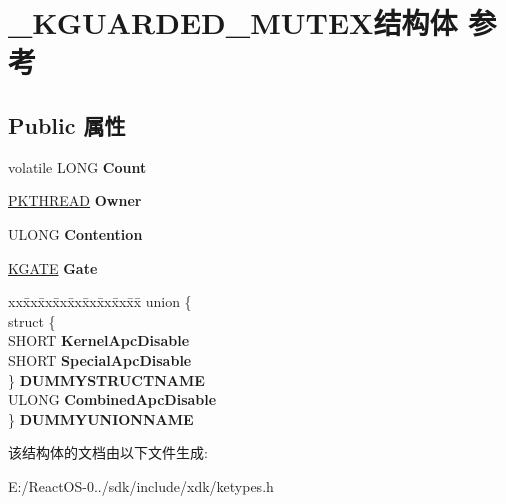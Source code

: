 \hypertarget{struct___k_g_u_a_r_d_e_d___m_u_t_e_x}{}\section{\+\_\+\+K\+G\+U\+A\+R\+D\+E\+D\+\_\+\+M\+U\+T\+E\+X结构体 参考}
\label{struct___k_g_u_a_r_d_e_d___m_u_t_e_x}
\subsection*{Public 属性}
\begin{DoxyCompactItemize}
\item 
\mbox{\label{struct___k_g_u_a_r_d_e_d___m_u_t_e_x_a9a756f46693351f97f96ad997d71e404}} 
volatile L\+O\+NG {\bfseries Count}
\item 
\mbox{\label{struct___k_g_u_a_r_d_e_d___m_u_t_e_x_ab94e8de101a12378b5f8170b63448724}} 
\hyperlink{struct___k_t_h_r_e_a_d}{P\+K\+T\+H\+R\+E\+AD} {\bfseries Owner}
\item 
\mbox{\label{struct___k_g_u_a_r_d_e_d___m_u_t_e_x_a9fbf6288be6b7168a35915b5f01e80b0}} 
U\+L\+O\+NG {\bfseries Contention}
\item 
\mbox{\label{struct___k_g_u_a_r_d_e_d___m_u_t_e_x_afe7beccd8f6dced4fd44e46fd3438ba4}} 
\hyperlink{struct___k_g_a_t_e}{K\+G\+A\+TE} {\bfseries Gate}
\item 
\mbox{\label{struct___k_g_u_a_r_d_e_d___m_u_t_e_x_af184d171ccb666c8edf290ff8e15a0c0}} 
\begin{tabbing}
xx\=xx\=xx\=xx\=xx\=xx\=xx\=xx\=xx\=\kill
union \{\\
\>struct \{\\
\>\>SHORT {\bfseries KernelApcDisable}\\
\>\>SHORT {\bfseries SpecialApcDisable}\\
\>\} {\bfseries DUMMYSTRUCTNAME}\\
\>ULONG {\bfseries CombinedApcDisable}\\
\} {\bfseries DUMMYUNIONNAME}\\

\end{tabbing}\end{DoxyCompactItemize}


该结构体的文档由以下文件生成\+:\begin{DoxyCompactItemize}
\item 
E\+:/\+React\+O\+S-\/0../sdk/include/xdk/ketypes.\+h\end{DoxyCompactItemize}
